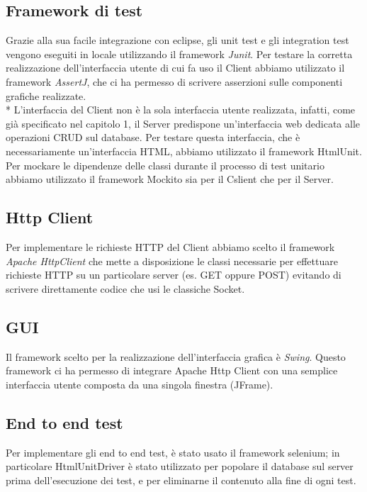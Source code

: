 \subsection{Framework di test}
Grazie alla sua facile integrazione con eclipse, gli unit test e gli integration test vengono eseguiti in locale utilizzando il framework \emph{Junit}. Per testare la corretta realizzazione dell'interfaccia utente di cui fa uso il Client abbiamo utilizzato il framework \emph{AssertJ}, che ci ha permesso di scrivere asserzioni sulle componenti grafiche realizzate.\\*
L'interfaccia del Client non \`e la sola interfaccia utente realizzata, infatti, come gi\`a specificato nel capitolo 1, il Server predispone un'interfaccia web dedicata alle operazioni CRUD sul database. Per testare questa interfaccia, che \`e necessariamente un'interfaccia HTML, abbiamo utilizzato il framework HtmlUnit. Per mockare le dipendenze delle classi durante il processo di test unitario abbiamo utilizzato il framework Mockito sia per il Cslient che per il Server.
\subsection{Http Client}
Per implementare le richieste HTTP del Client abbiamo scelto il framework \emph{Apache HttpClient} che mette a disposizione le classi necessarie per effettuare richieste HTTP su un particolare server (es. GET oppure POST) evitando di scrivere direttamente codice che usi le classiche Socket.
\subsection{GUI}
Il framework scelto per la realizzazione dell'interfaccia grafica \`e \emph{Swing}. Questo framework ci ha permesso di integrare Apache Http Client con una semplice interfaccia utente composta da una singola finestra (JFrame).
\subsection{End to end test}
Per implementare gli end to end test, \`e stato usato il framework selenium; in particolare HtmlUnitDriver \`e stato utilizzato per popolare il database sul server prima dell'esecuzione dei test, e per eliminarne il contenuto alla fine di ogni test.